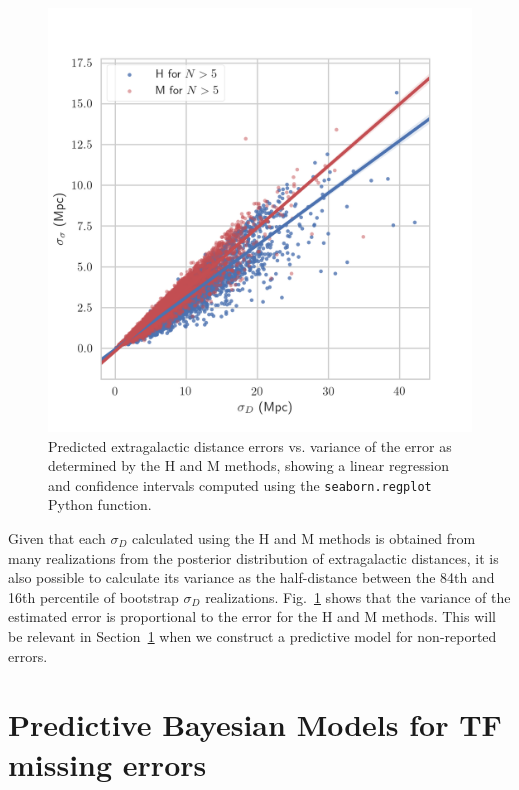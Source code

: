 \documentclass[a4paper,fleqn,usenatbib]{mnras}
\begin{document}
\begin{figure}

	\includegraphics[scale=0.7]{ee.png}
    \caption{Predicted extragalactic distance errors vs. variance of the error as determined by the H and M methods, showing a linear regression and confidence intervals computed using the \texttt{seaborn.regplot} Python function. }
    \label{fig:ee}
\end{figure}

Given that each $\sigma_D$ calculated using the H and M methods is obtained from many realizations from the posterior distribution of extragalactic distances, it is also possible to calculate its variance as the half-distance between the 84th and 16th percentile of bootstrap $\sigma_D$ realizations. Fig.~\ref{fig:ee} shows that the variance of the estimated error is proportional to the error for the H and M methods. This will be relevant in Section~\ref{sec:predbay} when we construct a predictive model for non-reported errors.

\section{Predictive Bayesian Models for TF missing errors}
\label{sec:predbay} 
\end{document}
